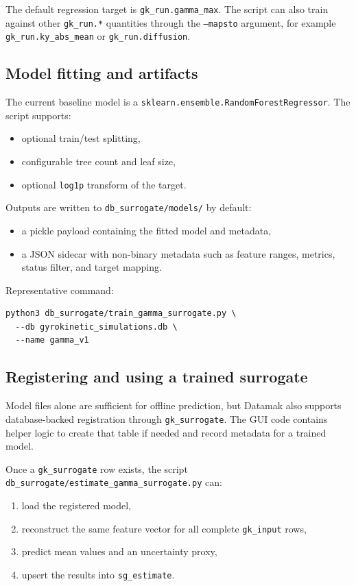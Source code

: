 \documentclass[11pt]{article}
\newcommand{\code}[1]{\texttt{#1}}
\begin{document}
The default regression target is \code{gk\_run.gamma\_max}. The script can also
train against other \code{gk\_run.*} quantities through the \code{--mapsto}
argument, for example \code{gk\_run.ky\_abs\_mean} or \code{gk\_run.diffusion}.

\subsection{Model fitting and artifacts}

The current baseline model is a
\code{sklearn.ensemble.RandomForestRegressor}. The script supports:

\begin{itemize}
\item optional train/test splitting,
\item configurable tree count and leaf size,
\item optional \code{log1p} transform of the target.
\end{itemize}

Outputs are written to \code{db\_surrogate/models/} by default:

\begin{itemize}
\item a pickle payload containing the fitted model and metadata,
\item a JSON sidecar with non-binary metadata such as feature ranges, metrics,
status filter, and target mapping.
\end{itemize}

Representative command:

\begin{verbatim}
python3 db_surrogate/train_gamma_surrogate.py \
  --db gyrokinetic_simulations.db \
  --name gamma_v1
\end{verbatim}

\subsection{Registering and using a trained surrogate}

Model files alone are sufficient for offline prediction, but Datamak also
supports database-backed registration through \code{gk\_surrogate}. The GUI code
contains helper logic to create that table if needed and record metadata for a
trained model.

Once a \code{gk\_surrogate} row exists, the script
\code{db\_surrogate/estimate\_gamma\_surrogate.py} can:

\begin{enumerate}
\item load the registered model,
\item reconstruct the same feature vector for all complete \code{gk\_input} rows,
\item predict mean values and an uncertainty proxy,
\item upsert the results into \code{sg\_estimate}.
\end{enumerate}
\end{document}
